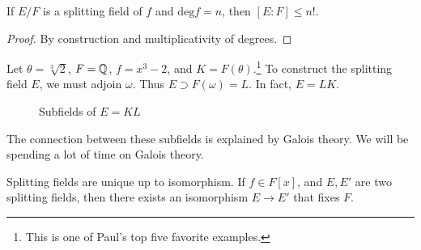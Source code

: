 \documentclass[10pt, twoside]{article}
\begin{document}
    \begin{cor}
        If $E/F$ is a splitting field of $f$ and $\mathrm{deg} f = n$, then $[E:F] \leq n!$.
        \begin{proof}
            By construction and multiplicativity of degrees.
        \end{proof}
    \end{cor}

    \begin{exm}
        Let $\theta = \sqrt[3]{2}$, $F=\mathbb{Q}$, $f=x^3-2$, and $K=F(\theta)$.\footnote{This is one of Paul's top five favorite examples.} To construct the splitting field $E$, we must adjoin $\omega$. Thus $E \supset F(\omega)=L$. In fact, $E=LK$.
    \end{exm}

    \begin{figure}[H]
        \begin{center}
        \end{center}
        \caption{Subfields of $E=KL$}%
        \label{fig:subfields}
    \end{figure}

    The connection between these subfields is explained by Galois theory. We will be spending a lot of time on Galois theory.

    \begin{thm}
        Splitting fields are unique up to isomorphism. If $f \in F[x]$, and $E,E'$ are two splitting fields, then there exists an isomorphism $E \rightarrow E'$ that fixes $F$.
    \end{thm}
\end{document}
